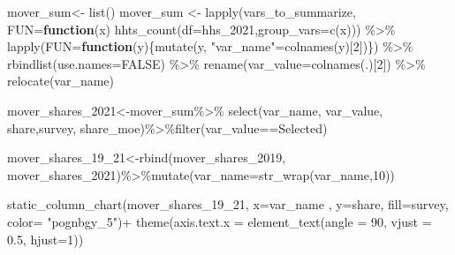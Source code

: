 \documentclass[
]{article}
\newenvironment{Shaded}{\begin{snugshade}}{\end{snugshade}}
\newcommand{\AttributeTok}[1]{\textcolor[rgb]{0.77,0.63,0.00}{#1}}
\newcommand{\ConstantTok}[1]{\textcolor[rgb]{0.00,0.00,0.00}{#1}}
\newcommand{\ControlFlowTok}[1]{\textcolor[rgb]{0.13,0.29,0.53}{\textbf{#1}}}
\newcommand{\DecValTok}[1]{\textcolor[rgb]{0.00,0.00,0.81}{#1}}
\newcommand{\FloatTok}[1]{\textcolor[rgb]{0.00,0.00,0.81}{#1}}
\newcommand{\FunctionTok}[1]{\textcolor[rgb]{0.00,0.00,0.00}{#1}}
\newcommand{\NormalTok}[1]{#1}
\newcommand{\OtherTok}[1]{\textcolor[rgb]{0.56,0.35,0.01}{#1}}
\newcommand{\SpecialCharTok}[1]{\textcolor[rgb]{0.00,0.00,0.00}{#1}}
\newcommand{\StringTok}[1]{\textcolor[rgb]{0.31,0.60,0.02}{#1}}
\begin{document}
\begin{Shaded}
\begin{Highlighting}[]
\NormalTok{mover\_sum}\OtherTok{\textless{}{-}} \FunctionTok{list}\NormalTok{()}
\NormalTok{mover\_sum }\OtherTok{\textless{}{-}} \FunctionTok{lapply}\NormalTok{(vars\_to\_summarize, }\AttributeTok{FUN=}\ControlFlowTok{function}\NormalTok{(x) }\FunctionTok{hhts\_count}\NormalTok{(}\AttributeTok{df=}\NormalTok{hhs\_2021,}\AttributeTok{group\_vars=}\FunctionTok{c}\NormalTok{(x))) }\SpecialCharTok{\%\textgreater{}\%}
    \FunctionTok{lapply}\NormalTok{(}\AttributeTok{FUN=}\ControlFlowTok{function}\NormalTok{(y)\{}\FunctionTok{mutate}\NormalTok{(y, }\StringTok{"var\_name"}\OtherTok{=}\FunctionTok{colnames}\NormalTok{(y)[}\DecValTok{2}\NormalTok{])\}) }\SpecialCharTok{\%\textgreater{}\%} \FunctionTok{rbindlist}\NormalTok{(}\AttributeTok{use.names=}\ConstantTok{FALSE}\NormalTok{) }\SpecialCharTok{\%\textgreater{}\%} 
    \FunctionTok{rename}\NormalTok{(}\AttributeTok{var\_value=}\FunctionTok{colnames}\NormalTok{(.)[}\DecValTok{2}\NormalTok{]) }\SpecialCharTok{\%\textgreater{}\%} \FunctionTok{relocate}\NormalTok{(var\_name)}

\NormalTok{mover\_shares\_2021}\OtherTok{\textless{}{-}}\NormalTok{mover\_sum}\SpecialCharTok{\%\textgreater{}\%} \FunctionTok{select}\NormalTok{(var\_name, var\_value, share,survey, share\_moe)}\SpecialCharTok{\%\textgreater{}\%}\FunctionTok{filter}\NormalTok{(var\_value}\SpecialCharTok{==}\StringTok{\textquotesingle{}Selected\textquotesingle{}}\NormalTok{)}
\end{Highlighting}
\end{Shaded}

\begin{Shaded}
\begin{Highlighting}[]
\NormalTok{mover\_shares\_19\_21}\OtherTok{\textless{}{-}}\FunctionTok{rbind}\NormalTok{(mover\_shares\_2019, mover\_shares\_2021)}\SpecialCharTok{\%\textgreater{}\%}\FunctionTok{mutate}\NormalTok{(}\AttributeTok{var\_name=}\FunctionTok{str\_wrap}\NormalTok{(var\_name,}\DecValTok{10}\NormalTok{))}

\FunctionTok{static\_column\_chart}\NormalTok{(mover\_shares\_19\_21, }\AttributeTok{x=}\StringTok{\textquotesingle{}var\_name\textquotesingle{}}\NormalTok{ , }\AttributeTok{y=}\StringTok{\textquotesingle{}share\textquotesingle{}}\NormalTok{, }\AttributeTok{fill=}\StringTok{\textquotesingle{}survey\textquotesingle{}}\NormalTok{, }\AttributeTok{color=} \StringTok{"pognbgy\_5"}\NormalTok{)}\SpecialCharTok{+} \FunctionTok{theme}\NormalTok{(}\AttributeTok{axis.text.x =} \FunctionTok{element\_text}\NormalTok{(}\AttributeTok{angle =} \DecValTok{90}\NormalTok{, }\AttributeTok{vjust =} \FloatTok{0.5}\NormalTok{, }\AttributeTok{hjust=}\DecValTok{1}\NormalTok{))}
\end{Highlighting}
\end{Shaded}
\end{document}
